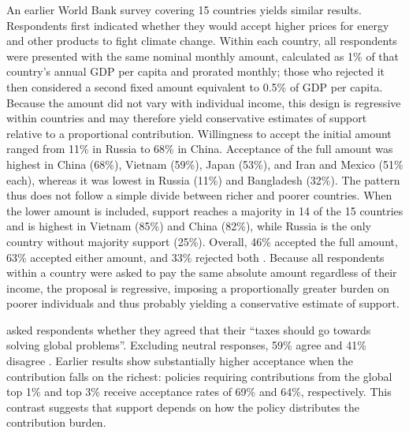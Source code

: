 \documentclass[11pt,a4paper]{article}
\begin{document}
An earlier World Bank survey covering 15 countries yields similar results. Respondents first indicated whether they would accept higher prices for energy and other products to fight climate change. Within each country, all respondents were presented with the same nominal monthly amount, calculated as 1\% of that country's annual GDP per capita and prorated monthly; those who rejected it then considered a second fixed amount equivalent to 0.5\% of GDP per capita. Because the amount did not vary with individual income, this design is regressive within countries and may therefore yield conservative estimates of support relative to a proportional contribution. Willingness to accept the initial amount ranged from 11\% in Russia to 68\% in China. Acceptance of the full amount was highest in China (68\%), Vietnam (59\%), Japan (53\%), and Iran and Mexico (51\% each), whereas it was lowest in Russia (11\%) and Bangladesh (32\%). The pattern thus does not follow a simple divide between richer and poorer countries. When the lower amount is included, support reaches a majority in 14 of the 15 countries and is highest in Vietnam (85\%) and China (82\%), while Russia is the only country without majority support (25\%). Overall, 46\% accepted the full amount, 63\% accepted either amount, and 33\% rejected both \citep{world_bank_public_2009}. Because all respondents within a country were asked to pay the same absolute amount regardless of their income, the proposal is regressive, imposing a proportionally greater burden on poorer individuals and thus probably yielding a conservative estimate of support.


\citet{fabre_public_2026} asked respondents whether they agreed that their ``taxes should go towards solving global problems''. Excluding neutral responses, 59\% agree and 41\% disagree \citep[Figures S59--S60]{fabre_public_2026}.
Earlier results show substantially higher acceptance when the contribution falls on the richest: policies requiring contributions from the global top 1\% and top 3\% receive acceptance rates of 69\% and 64\%, respectively. This contrast suggests that support depends on how the policy distributes the contribution burden.
\end{document}
